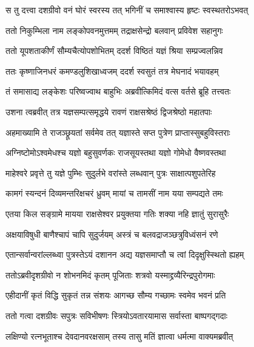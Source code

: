 
\twolineshloka
{स तु दत्त्वा दशग्रीवो वनं घोरं स्वरस्य तत्}
{भगिनीं च समाश्वास्य हृष्टः स्वस्थतरोऽभवत्} %

\twolineshloka
{ततो निकुम्भिला नाम लङ्कोपवनमुत्तमम्}
{तद्राक्षसेन्द्रो बलवान् प्रविवेश सहानुगः} %

\twolineshloka
{ततो यूपशताकीर्णं सौम्यचैत्योपशोभितम्}
{ददर्श विष्ठितं यज्ञं श्रिया सम्प्रज्वलन्निव} %

\twolineshloka
{ततः कृष्णाजिनधरं कमण्डलुशिखाध्वजम्}
{ददर्श स्वसुतं तत्र मेघनादं भयावहम्} %

\twolineshloka
{तं समासाद्य लङ्केशः परिष्वज्वाथ बाहुभिः}
{अब्रवीत्किमिदं वत्स वर्तसे ब्रूहि तत्त्वतः} %

\twolineshloka
{उशना त्वब्रवीत् तत्र यज्ञसम्पत्समृद्धये}
{रावणं राक्षसश्रेष्ठं द्विजश्रेष्ठो महातपाः} %

\twolineshloka
{अहमाख्यामि ते राजञ्छ्रूयतां सर्वमेव तत्}
{यज्ञास्ते सप्त पुत्रेण प्राप्तास्सुबहुविस्तराः} %

\twolineshloka
{अग्निष्टोमोऽश्वमेधश्च यज्ञो बहुसुवर्णकः}
{राजसूयस्तथा यज्ञो गोमेधो वैष्णवस्तथा} %

\twolineshloka
{माहेश्वरे प्रवृत्ते तु यज्ञे पुम्भिः सुदुर्लभे}
{वरांस्ते लब्धवान् पुत्रः साक्षात्पशुपतेरिह} %

\twolineshloka
{कामगं स्यन्दनं दिव्यमन्तरिक्षचरं ध्रुवम्}
{मायां च तामसीं नाम यया सम्पद्यते तमः} %

\twolineshloka
{एतया किल सङ्ग्रामे मायया राक्षसेश्वर}
{प्रयुक्तया गतिः शक्या नहि ज्ञातुं सुरासुरैः} %

\twolineshloka
{अक्षयाविषुधी बाणैश्चापं चापि सुदुर्जयम्}
{अस्त्रं च बलवद्राजञ्छत्रुविध्वंसनं रणे} %

\twolineshloka
{एतान्सर्वान्वरांल्लब्ध्वा पुत्रस्तेऽयं दशानन}
{अद्य यज्ञसमाप्तौ च त्वां दिदृक्षुस्स्थितो ह्यहम्} %

\twolineshloka
{ततोऽब्रवीदृशग्रीवो न शोभनमिदं कृतम्}
{पूजिताः शत्रवो यस्माद्द्रव्यैरिन्द्रपुरोगमाः} %

\twolineshloka
{एहीदानीं कृतं विद्धि सुकृतं तन्न संशयः}
{आगच्छ सौम्य गच्छामः स्वमेव भवनं प्रति} %

\twolineshloka
{ततो गत्वा दशग्रीवः सपुत्रः सविभीषणः}
{स्त्रियोऽवतारयामास सर्वास्ता बाष्पगद्गदाः} %

\twolineshloka
{लक्षिण्यो रत्नभूताश्च देवदानवरक्षसाम्}
{तस्य तासु मतिं ज्ञात्वा धर्मत्मा वाक्यमब्रवीत्} %

